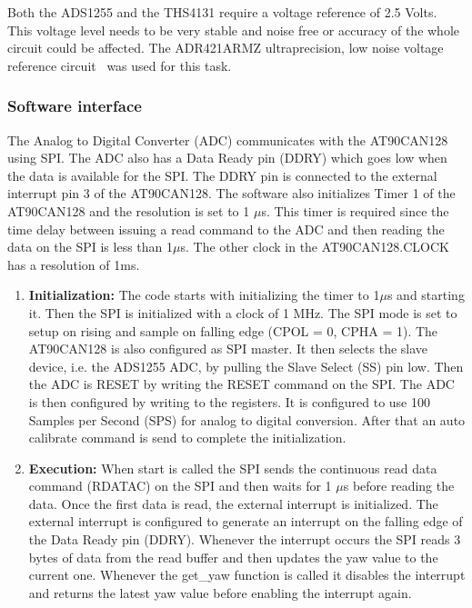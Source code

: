 Both the ADS1255 and the THS4131 require a voltage reference of 2.5 Volts. This voltage level needs to be very stable and noise free or accuracy of the whole circuit could be affected. The ADR421ARMZ ultraprecision, low noise voltage reference circuit~\cite{web:adr421} was used for this task.

\subsubsection{Software interface}
The Analog to Digital Converter (ADC) communicates with the AT90CAN128 using SPI. The ADC also has a Data Ready pin (DDRY) which goes low when the data is available for the SPI. The DDRY pin is connected to the external interrupt pin 3 of the AT90CAN128. The software also initializes Timer 1 of the AT90CAN128 and the resolution is set to 1 $\mu$s. This timer is required since the time delay between issuing a read command to the ADC and then reading the data on the SPI is less than 1$\mu$s. The other clock in the AT90CAN128.CLOCK has a resolution of 1ms.
\begin{enumerate}
\item \textbf{Initialization:} The code starts with initializing the timer to 1$\mu$s and starting it. Then the SPI is initialized with a clock of 1 MHz. The SPI mode is set to setup on rising and sample on falling edge (CPOL = 0, CPHA = 1). The AT90CAN128 is also configured as SPI master. It then selects the slave device, i.e. the ADS1255 ADC, by pulling  the Slave Select (SS) pin low. Then the ADC is RESET by writing the RESET command on the SPI. The ADC is then configured by writing to the registers. It is configured to use 100 Samples per Second (SPS) for analog to digital conversion. After that an auto calibrate command is send to complete the initialization. 

\item \textbf{Execution:} When start is called the SPI sends the continuous read data command (RDATAC) on the SPI and then waits for 1 $\mu$s before reading the data. Once the first data is read, the external interrupt is initialized. The external interrupt is configured to generate an interrupt on the falling edge of the Data Ready pin (DDRY). Whenever the interrupt occurs the SPI reads 3 bytes of data from the read buffer and then updates the yaw value to the current one. Whenever the get\_yaw function is called it disables the interrupt and returns the latest yaw value before enabling the interrupt again.
\end{enumerate}
\newpage
